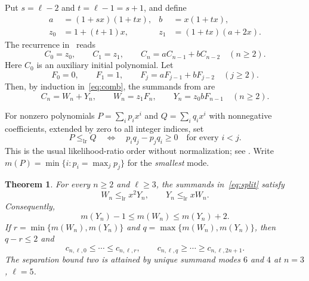 \documentclass[11pt]{article}
\newtheorem{theorem}{Theorem}
\newcommand{\lr}{\mathrel{\leq_{\mathrm{lr}}}}
\begin{document}
Put $s=\ell-2$ and $t=\ell-1=s+1$, and define
\begin{equation}\label{eq:factors}
 \begin{aligned}
 a&=(1+sx)(1+tx), & b&=x(1+tx),\\
 z_0&=1+(t+1)x, & z_1&=(1+tx)(a+2x).
 \end{aligned}
\end{equation}
The recurrence in~\cite{GS} reads
\begin{equation}\label{eq:comb}
 C_0=z_0,\qquad C_1=z_1,\qquad C_n=aC_{n-1}+bC_{n-2}\quad(n\geq2).
\end{equation}
Here $C_0$ is an auxiliary initial polynomial. Let
\begin{equation}\label{eq:F}
 F_0=0,\qquad F_1=1,\qquad F_j=aF_{j-1}+bF_{j-2}\quad(j\geq2).
\end{equation}
Then, by induction in~\eqref{eq:comb}, the summands from
\cite[Section 2.5, equations (28)--(30)]{GS} are
\begin{equation}\label{eq:split}
 C_n=W_n+Y_n,\qquad W_n=z_1F_n,\qquad Y_n=z_0bF_{n-1}\quad(n\geq2).
\end{equation}

For nonzero polynomials $P=\sum_i p_ix^i$ and $Q=\sum_i q_ix^i$ with
nonnegative coefficients, extended by zero to all integer indices, set
\begin{equation}\label{eq:order}
 P\lr Q\quad\Longleftrightarrow\quad
 p_iq_j-p_jq_i\geq0\quad\text{for every }i<j.
\end{equation}
This is the usual likelihood-ratio order without normalization; see
\cite[Section 2]{DM}. Write $m(P)=\min\{i:p_i=\max_j p_j\}$ for the
\emph{smallest} mode.

\begin{theorem}\label{thm:main}
For every $n\geq2$ and $\ell\geq3$, the summands in~\eqref{eq:split} satisfy
\begin{equation}\label{eq:mainorder}
 W_n\lr x^2Y_n,\qquad Y_n\lr xW_n.
\end{equation}
Consequently,
\begin{equation}\label{eq:modes}
 m(Y_n)-1\leq m(W_n)\leq m(Y_n)+2.
\end{equation}
If $r=\min\{m(W_n),m(Y_n)\}$ and $q=\max\{m(W_n),m(Y_n)\}$, then
$q-r\leq2$ and
\begin{equation}\label{eq:tails}
 c_{n,\ell,0}\leq\cdots\leq c_{n,\ell,r},\qquad
 c_{n,\ell,q}\geq\cdots\geq c_{n,\ell,2n+1}.
\end{equation}
The separation bound two is attained by unique summand modes $6$ and $4$
at $n=3$, $\ell=5$.
\end{theorem}
\end{document}
